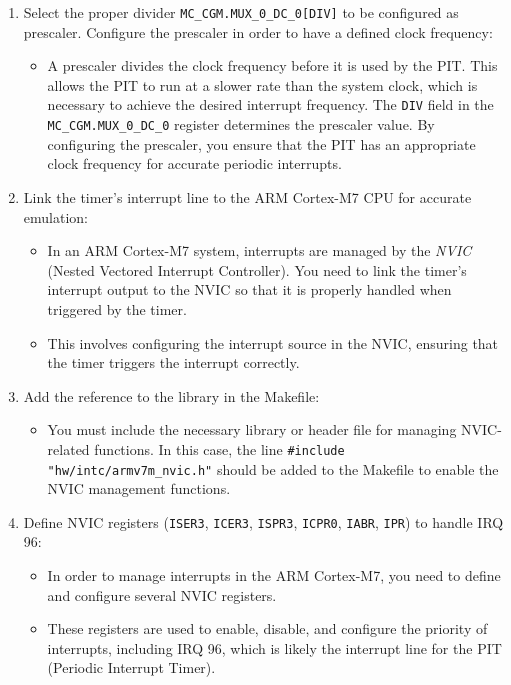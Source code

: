 \begin{enumerate}
\begin{itemize}
            \end{itemize}
        \item Select the proper divider \texttt{MC\_CGM.MUX\_0\_DC\_0[DIV]} to be configured as prescaler. Configure the prescaler in order to have a defined clock frequency:
            \begin{itemize}
                \item A prescaler divides the clock frequency before it is used by the PIT. This allows the PIT to run at a slower rate than the system clock, which is necessary to achieve the desired interrupt frequency. The \texttt{DIV} field in the \texttt{MC\_CGM.MUX\_0\_DC\_0} register determines the prescaler value. By configuring the prescaler, you ensure that the PIT has an appropriate clock frequency for accurate periodic interrupts.
            \end{itemize}
            \item Link the timer’s interrupt line to the ARM Cortex-M7 CPU for accurate emulation:
            \begin{itemize}
                \item In an ARM Cortex-M7 system, interrupts are managed by the \textit{NVIC} (Nested Vectored Interrupt Controller). You need to link the timer's interrupt output to the NVIC so that it is properly handled when triggered by the timer.
                \item This involves configuring the interrupt source in the NVIC, ensuring that the timer triggers the interrupt correctly.
            \end{itemize}
            
            \item Add the reference to the library in the Makefile: 
            \begin{itemize}
                \item You must include the necessary library or header file for managing NVIC-related functions. In this case, the line \texttt{\#include "hw/intc/armv7m\_nvic.h"} should be added to the Makefile to enable the NVIC management functions.
            \end{itemize}
            
            \item Define NVIC registers (\texttt{ISER3}, \texttt{ICER3}, \texttt{ISPR3}, \texttt{ICPR0}, \texttt{IABR}, \texttt{IPR}) to handle IRQ 96:
            \begin{itemize}
                \item In order to manage interrupts in the ARM Cortex-M7, you need to define and configure several NVIC registers.
                \item These registers are used to enable, disable, and configure the priority of interrupts, including IRQ 96, which is likely the interrupt line for the PIT (Periodic Interrupt Timer).
            \end{itemize}
        \end{enumerate}
    
